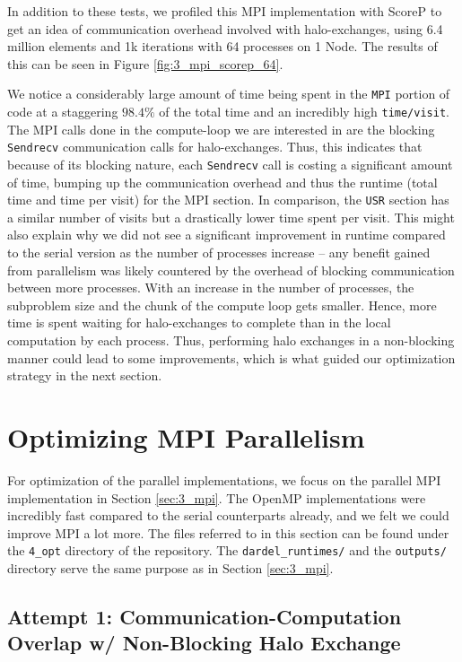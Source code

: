 \documentclass[a4paper,10pt]{article}
\begin{document}
\begin{multicols}{2}
In addition to these tests, we profiled this MPI implementation with ScoreP to get an idea of communication overhead involved with halo-exchanges, using 6.4 million elements and 1k iterations with 64 processes on 1 Node. The results of this can be seen in Figure \ref{fig:3_mpi_scorep_64}. 

We notice a considerably large amount of time being spent in the \verb|MPI| portion of code at a staggering $98.4\%$ of the total time and an incredibly high \verb|time/visit|. The MPI calls done in the compute-loop we are interested in are the blocking \verb|Sendrecv| communication calls for halo-exchanges. Thus, this indicates that because of its blocking nature, each \verb|Sendrecv| call is costing a significant amount of time, bumping up the communication overhead and thus the runtime (total time and time per visit) for the MPI section. In comparison, the \verb|USR| section has a similar number of visits but a drastically lower time spent per visit. This might also explain why we did not see a significant improvement in runtime compared to the serial version as the number of processes increase -- any benefit gained from parallelism was likely countered by the overhead of blocking communication between more processes. With an increase in the number of processes, the subproblem size and the chunk of the compute loop gets smaller. Hence, more time is spent waiting for halo-exchanges to complete than in the local computation by each process. Thus, performing halo exchanges in a non-blocking manner could lead to some improvements, which is what guided our optimization strategy in the next section.

\section{Optimizing MPI Parallelism}
For optimization of the parallel implementations, we focus on the parallel MPI implementation in Section \ref{sec:3_mpi}. The OpenMP implementations were incredibly fast compared to the serial counterparts already, and we felt we could improve MPI a lot more. The files referred to in this section can be found under the \verb|4_opt| directory of the repository. The \verb|dardel_runtimes/| and the \verb|outputs/| directory serve the same purpose as in Section \ref{sec:3_mpi}.

\subsection{Attempt 1: Communication-Computation Overlap w/ Non-Blocking Halo Exchange}
\label{sec:async_mpi}
\end{multicols}
\end{document}
